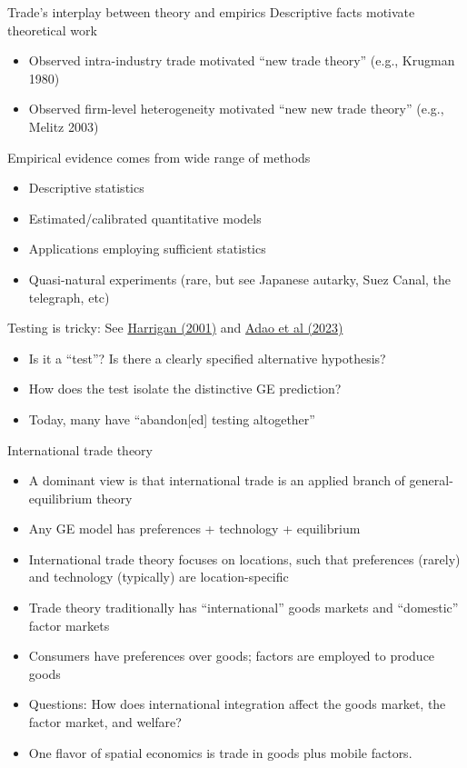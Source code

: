\documentclass[10pt,notes=hide,aspectratio=169]{beamer}
\begin{document}
\begin{frame}{Trade's interplay between theory and empirics}
Descriptive facts motivate theoretical work
\begin{itemize}
	\item Observed intra-industry trade motivated ``new trade theory'' (e.g., Krugman 1980)
	\item Observed firm-level heterogeneity motivated ``new new trade theory'' (e.g., Melitz 2003)
\end{itemize}
Empirical evidence comes from wide range of methods
\begin{itemize}
	\item Descriptive statistics
	\item Estimated/calibrated quantitative models
	\item Applications employing sufficient statistics
	\item Quasi-natural experiments (rare, but see Japanese autarky, Suez Canal, the telegraph, etc)
\end{itemize}
Testing is tricky: See \href{https://www.nber.org/papers/w8675}{Harrigan (2001)} and \href{https://www.nber.org/papers/w31321}{Adao et al (2023)}
\begin{itemize}
\item Is it a ``test''? Is there a clearly specified alternative hypothesis?
\item How does the test isolate the distinctive GE prediction?
\item Today, many have ``abandon[ed] testing altogether''
\end{itemize}
\end{frame}
\begin{frame}{International trade theory}
\begin{itemize}
	\item A dominant view is that international trade is an applied branch of general-equilibrium theory
	\item Any GE model has preferences + technology + equilibrium
	\item International trade theory focuses on locations, such that preferences (rarely) and technology (typically) are location-specific
	\item Trade theory traditionally has ``international'' goods markets and ``domestic'' factor markets
	\item Consumers have preferences over goods; factors are employed to produce goods
	\item Questions: How does international integration affect the goods market, the factor market, and welfare?
	\item One flavor of spatial economics is trade in goods plus mobile factors.
\end{itemize}
\end{frame}
\end{document}
